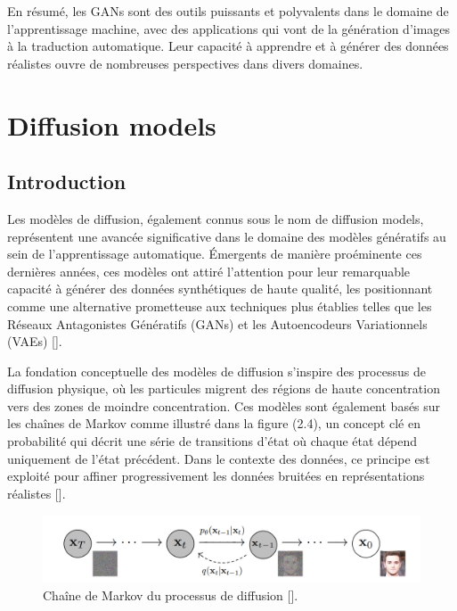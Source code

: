 En résumé, les GANs sont des outils puissants et polyvalents dans le domaine de
l'apprentissage machine, avec des applications qui vont de la génération
d'images à la traduction automatique. Leur capacité à apprendre et à générer
des données réalistes ouvre de nombreuses perspectives dans divers domaines.

\section{Diffusion models}
\subsection{Introduction}

Les modèles de diffusion, également connus sous le nom de diffusion models,
représentent une avancée significative dans le domaine des modèles génératifs
au sein de l'apprentissage automatique. Émergents de manière proéminente ces
dernières années, ces modèles ont attiré l'attention pour leur remarquable
capacité à générer des données synthétiques de haute qualité, les positionnant
comme une alternative prometteuse aux techniques plus établies telles que les
Réseaux Antagonistes Génératifs (GANs) et les Autoencodeurs Variationnels
(VAEs) [\cite{ho2020denoising}].

La fondation conceptuelle des modèles de diffusion s'inspire des processus de
diffusion physique, où les particules migrent des régions de haute
concentration vers des zones de moindre concentration. Ces modèles sont
également basés sur les chaînes de Markov comme illustré dans la figure (2.4), un concept clé en probabilité qui
décrit une série de transitions d'état où chaque état dépend uniquement de
l'état précédent. Dans le contexte des données, ce principe est exploité pour
affiner progressivement les données bruitées en représentations réalistes
[\cite{yang2022diffusion}].

\begin{figure}[hbt!]
	\centering
	\includegraphics[width=12cm]{images_pfe/markov.png}
	\caption{Chaîne de Markov du processus de diffusion [\cite{ho2020denoising}].}
	\label{fig:markov}
\end{figure}
\FloatBarrier


